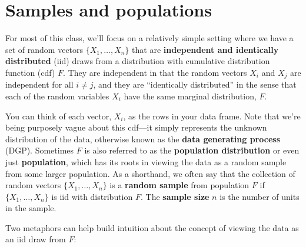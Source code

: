 \documentclass[
  letterpaper,
  DIV=11,
  numbers=noendperiod]{scrreprt}
\theoremstyle{definition}
\theoremstyle{plain}
\theoremstyle{definition}
\theoremstyle{remark}
\begin{document}
\hypertarget{samples-and-populations}{%
\section{Samples and populations}\label{samples-and-populations}}

For most of this class, we'll focus on a relatively simple setting where
we have a set of random vectors \(\{X_1, \ldots, X_n\}\) that are
\textbf{independent and identically distributed} (iid) draws from a
distribution with cumulative distribution function (cdf) \(F\). They are
independent in that the random vectors \(X_i\) and \(X_j\) are
independent for all \(i \neq j\), and they are ``identically
distributed'' in the sense that each of the random variables \(X_i\)
have the same marginal distribution, \(F\).

You can think of each vector, \(X_i\), as the rows in your data frame.
Note that we're being purposely vague about this cdf---it simply
represents the unknown distribution of the data, otherwise known as the
\textbf{data generating process} (DGP). Sometimes \(F\) is also referred
to as the \textbf{population distribution} or even just
\textbf{population}, which has its roots in viewing the data as a random
sample from some larger population. As a shorthand, we often say that
the collection of random vectors \(\{X_1, \ldots, X_n\}\) is a
\textbf{random sample} from population \(F\) if \(\{X_1, \ldots, X_n\}\)
is iid with distribution \(F\). The \textbf{sample size} \(n\) is the
number of units in the sample.

Two metaphors can help build intuition about the concept of viewing the
data as an iid draw from \(F\):
\end{document}
